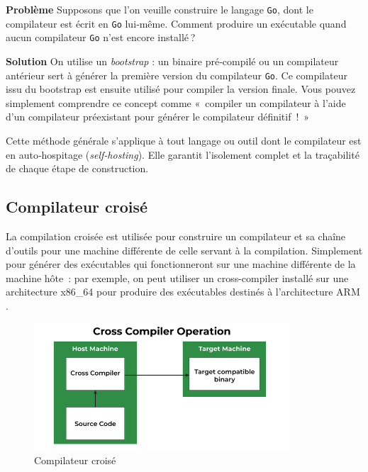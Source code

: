 \bigskip
\noindent
\textbf{Problème}  
Supposons que l’on veuille construire le langage \texttt{Go}, dont le compilateur est écrit en \texttt{Go} lui‑même. Comment produire un exécutable quand aucun compilateur \texttt{Go} n’est encore installé ?

\medskip
\noindent
\textbf{Solution}  
On utilise un \emph{bootstrap} : un binaire pré‑compilé ou un compilateur antérieur sert à générer la première version du compilateur \texttt{Go}. Ce compilateur issu du bootstrap est ensuite utilisé pour compiler la version finale.  
Vous pouvez simplement comprendre ce concept comme « compiler un compilateur à l’aide d’un compilateur préexistant pour générer le compilateur définitif ! »



Cette méthode générale s’applique à tout langage ou outil dont le compilateur est en auto‑hospitage (\emph{self‑hosting}). Elle garantit l’isolement complet et la traçabilité de chaque étape de construction.


\subsection{Compilateur croisé}
\label{subsec:cross-compiler}

La compilation croisée est utilisée pour construire un compilateur et sa chaîne d’outils pour une machine différente de celle servant à la compilation.  
Simplement pour générer des exécutables qui fonctionneront sur une machine différente de la machine hôte : par exemple, on peut utiliser un cross-compiler installé sur une architecture x86\_64 pour produire des exécutables destinés à l’architecture ARM .

\begin{figure}[!htbp]
  \centering
  \includegraphics[width=0.85\textwidth]{images_pfe/crosscompiler.png}
  \caption{Compilateur croisé}
  \label{fig:crosscompiler}
\end{figure}

